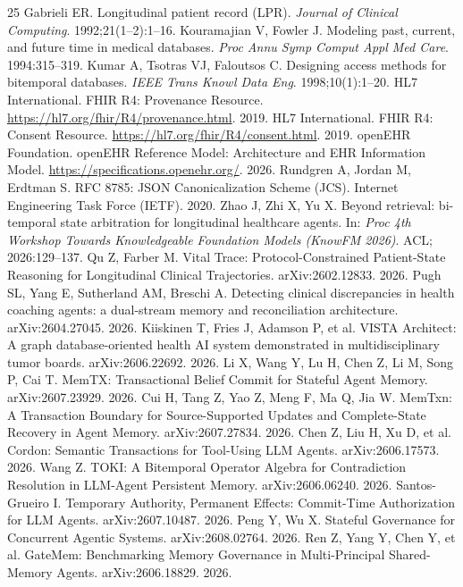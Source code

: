 \documentclass[11pt,a4paper]{article}
\begin{document}
\begin{thebibliography}{25}
 Gabrieli ER. Longitudinal patient record (LPR). \emph{Journal of Clinical Computing}. 1992;21(1--2):1--16.
 Kouramajian V, Fowler J. Modeling past, current, and future time in medical databases. \emph{Proc Annu Symp Comput Appl Med Care}. 1994:315--319.
 Kumar A, Tsotras VJ, Faloutsos C. Designing access methods for bitemporal databases. \emph{IEEE Trans Knowl Data Eng}. 1998;10(1):1--20.
 HL7 International. FHIR R4: Provenance Resource. \url{https://hl7.org/fhir/R4/provenance.html}. 2019.
 HL7 International. FHIR R4: Consent Resource. \url{https://hl7.org/fhir/R4/consent.html}. 2019.
 openEHR Foundation. openEHR Reference Model: Architecture and EHR Information Model. \url{https://specifications.openehr.org/}. 2026.
 Rundgren A, Jordan M, Erdtman S. RFC 8785: JSON Canonicalization Scheme (JCS). Internet Engineering Task Force (IETF). 2020.
 Zhao J, Zhi X, Yu X. Beyond retrieval: bi-temporal state arbitration for longitudinal healthcare agents. In: \emph{Proc 4th Workshop Towards Knowledgeable Foundation Models (KnowFM 2026)}. ACL; 2026:129--137.
 Qu Z, Farber M. Vital Trace: Protocol-Constrained Patient-State Reasoning for Longitudinal Clinical Trajectories. arXiv:2602.12833. 2026.
 Pugh SL, Yang E, Sutherland AM, Breschi A. Detecting clinical discrepancies in health coaching agents: a dual-stream memory and reconciliation architecture. arXiv:2604.27045. 2026.
 Kiiskinen T, Fries J, Adamson P, et al. VISTA Architect: A graph database-oriented health AI system demonstrated in multidisciplinary tumor boards. arXiv:2606.22692. 2026.
 Li X, Wang Y, Lu H, Chen Z, Li M, Song P, Cai T. MemTX: Transactional Belief Commit for Stateful Agent Memory. arXiv:2607.23929. 2026.
 Cui H, Tang Z, Yao Z, Meng F, Ma Q, Jia W. MemTxn: A Transaction Boundary for Source-Supported Updates and Complete-State Recovery in Agent Memory. arXiv:2607.27834. 2026.
 Chen Z, Liu H, Xu D, et al. Cordon: Semantic Transactions for Tool-Using LLM Agents. arXiv:2606.17573. 2026.
 Wang Z. TOKI: A Bitemporal Operator Algebra for Contradiction Resolution in LLM-Agent Persistent Memory. arXiv:2606.06240. 2026.
 Santos-Grueiro I. Temporary Authority, Permanent Effects: Commit-Time Authorization for LLM Agents. arXiv:2607.10487. 2026.
 Peng Y, Wu X. Stateful Governance for Concurrent Agentic Systems. arXiv:2608.02764. 2026.
 Ren Z, Yang Y, Chen Y, et al. GateMem: Benchmarking Memory Governance in Multi-Principal Shared-Memory Agents. arXiv:2606.18829. 2026.
\end{thebibliography}
\end{document}
